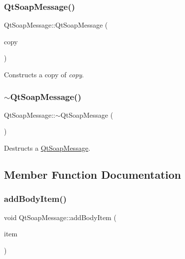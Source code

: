 \subsubsection{\texorpdfstring{Qt\+Soap\+Message()}{QtSoapMessage()}\hspace{0.1cm}{\footnotesize\ttfamily [2/2]}}
{\footnotesize\ttfamily Qt\+Soap\+Message\+::\+Qt\+Soap\+Message (\begin{DoxyParamCaption}\item[{const \mbox{\hyperlink{class_qt_soap_message}{Qt\+Soap\+Message}} \&}]{copy }\end{DoxyParamCaption})}

Constructs a copy of {\itshape copy}. \mbox{\label{class_qt_soap_message_ac71afb2d55c00f27b793e99380cdcc32}} 
\subsubsection{\texorpdfstring{$\sim$\+Qt\+Soap\+Message()}{~QtSoapMessage()}}
{\footnotesize\ttfamily Qt\+Soap\+Message\+::$\sim$\+Qt\+Soap\+Message (\begin{DoxyParamCaption}{ }\end{DoxyParamCaption})}

Destructs a \mbox{\hyperlink{class_qt_soap_message}{Qt\+Soap\+Message}}. 

\subsection{Member Function Documentation}
\mbox{\label{class_qt_soap_message_a16c43285b934153623d541f061dd1910}} 
\subsubsection{\texorpdfstring{add\+Body\+Item()}{addBodyItem()}}
{\footnotesize\ttfamily void Qt\+Soap\+Message\+::add\+Body\+Item (\begin{DoxyParamCaption}\item[{\mbox{\hyperlink{class_qt_soap_type}{Qt\+Soap\+Type}} $\ast$}]{item }\end{DoxyParamCaption})}

